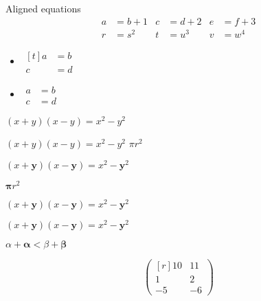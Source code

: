\documentclass{article}
\begin{document}
 Aligned equations
 \begin{align*}
 a &= b+1 & c &= d+2 & e &= f+3 \\
 r &= s^{2} & t &=u^{3} & v &= w^{4}
 \end{align*}

 \begin{itemize}
 \item
 $\begin{aligned}[t]
 a&=b\\
 c&=d
 \end{aligned}$
 \item
 $\begin{aligned}
 a&=b\\
 c&=d
 \end{aligned}$
 \end{itemize}

$(x+y)(x-y)=x^{2}-y^{2}$

 {\boldmath $(x+y)(x-y)=x^{2}-y^{2}$ $\pi r^2$}

 $(x+\mathbf{y})(x-\mathbf{y})=x^{2}-{\mathbf{y}}^{2}$

 $\mathbf{\pi} r^2$ %

 $(x+\mathbf{y})(x-\mathbf{y})=x^{2}-{\mathbf{y}}^{2}$

 $(x+\bm{y})(x-\bm{y}) \bm{=} x^{2}-{\bm{y}}^{2}$

 $\alpha + \bm{\alpha} < \beta + \bm{\beta}$

\[
 \begin{pmatrix*}[r]
 10&11\\
 1&2\\-5&-6
 \end{pmatrix*}
 \]

 
\end{document}
